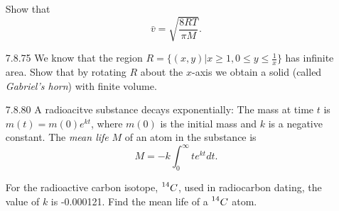 \documentclass{article}
\begin{document}
\begin{enumerate}
    Show that
    \[
        \bar{v} = \sqrt{\frac{8RT}{\pi M}}.
    \]

\vspace{5cm}

\item[7.8.75]
    We know that the region
    $R = \{(x, y) | x \geqslant 1, 0 \leqslant y \leqslant \frac{1}{x}\}$
    has infinite area. Show that by rotating $R$ about the $x$-axis
    we obtain a solid (called \textit{Gabriel's horn}) with finite volume.

\vspace{5cm}

\item[7.8.80]
    A radioacitve substance decays exponentially: The mass at time $t$
    is $m(t) = m(0) e^{kt}$, where $m(0)$ is the initial mass and
    $k$ is a negative constant. The \textit{mean life} $M$ of an atom
    in the substance is
    \[
        M = -k \int_{0}^{\infty} t e^{kt} dt.
    \]

    For the radioactive carbon isotope, $\prescript{14}{}{C}$, used
    in radiocarbon dating, the value of $k$ is -0.000121.
    Find the mean life of a $\prescript{14}{}{C}$ atom.

\end{enumerate}
\end{document}
